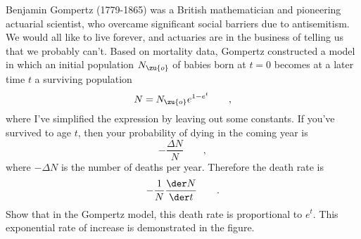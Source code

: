 Benjamin Gompertz (1779-1865) was a British mathematician and pioneering
actuarial scientist, who overcame significant social barriers due to
antisemitism. We would all like to live forever, and actuaries are in
the business of telling us that we probably can't. Based on mortality
data, Gompertz constructed a model in which an initial population $N_\zu{o}$
of babies born at $t=0$ becomes at a later time $t$ a surviving population
\begin{equation*}
  N = N_\zu{o} e^{1-e^t} \qquad ,
\end{equation*}
where I've simplified the expression by leaving out some constants.
If you've survived to age $t$, then your probability of dying in the coming
year is
\begin{equation*}
  -\frac{\Delta N}{N} \qquad ,
\end{equation*}
where $-\Delta N$ is the number of deaths per year. Therefore the death rate is
\begin{equation*}
  -\frac{1}{N}\frac{\der N}{\der t} \qquad .
\end{equation*}
Show that in the Gompertz model, this death rate is proportional to
$e^t$. This exponential rate of increase is demonstrated in the figure.
